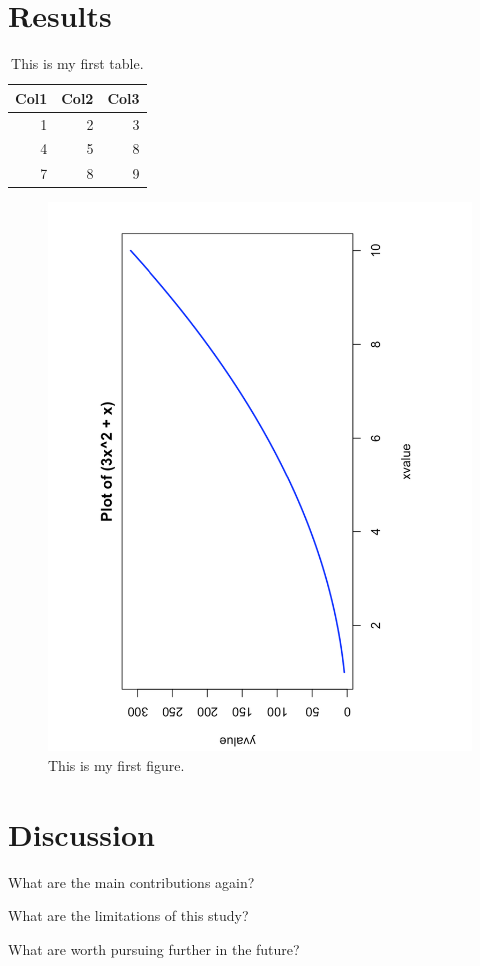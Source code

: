 \documentclass[12pt]{article}
\begin{document}
\section{Results}
\label{sec:results}

\begin{table}[ht]
  \caption{This is my first table.}
  \label{tab:rv}
\centering
\begin{tabular}{rrr}
  \hline
Col1 & Col2 & Col3 \\ 
  \hline
1 & 2 & 3 \\ 
4 & 5 & 8\\ 
7 & 8 & 9\\ 
   \hline
\end{tabular}
\end{table}



\begin{figure}
  \centering
  \includegraphics[width=\textwidth]{figure.pdf}
  \caption{This is my first figure.}
  \label{fig:graph}
\end{figure}

\section{Discussion}
\label{sec:disc}

What are the main contributions again?

What are the limitations of this study?

What are worth pursuing further in the future?

\lipsum[1-2]



\end{document}
